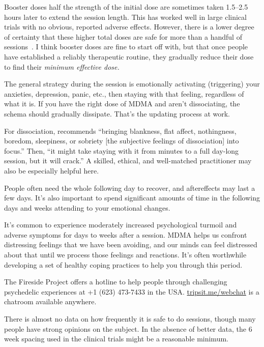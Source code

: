 \documentclass[11pt,oneside]{book}
\newcommand{\mdcite}[1]{}
\begin{document}
Booster doses half the strength of the initial dose are sometimes taken 1.5--2.5\,hours later to extend the session length. This has worked well in large clinical trials with no obvious, reported adverse effects. However, there is a lower degree of certainty that these higher total doses are safe for more than a handful of sessions~\mdcite{baggottSupplements}. I think booster doses are fine to start off with, but that once people have established a reliably therapeutic routine, they gradually reduce their dose to find their \textit{minimum effective dose.}

The general strategy during the session is emotionally activating (triggering) your anxieties, depression, panic, etc., then staying with that feeling, regardless of what it is. If you have the right dose of MDMA and aren't dissociating, the schema should gradually dissipate. That's the updating process at work.

For dissociation, \textcite[p. 14]{razviPSIP} recommends \enquote{bringing blankness, flat affect, nothingness, boredom, sleepiness, or sobriety [the subjective feelings of dissociation] into focus.} Then, \enquote{it might take staying with it from minutes to a full day-long session, but it will crack.} A skilled, ethical, and well-matched practitioner may also be especially helpful here.

People often need the whole following day to recover, and aftereffects may last a few days. It's also important to spend significant amounts of time in the following days and weeks attending to your emotional changes.

It's common to experience moderately increased psychological turmoil and adverse symptoms for days to weeks after a session. MDMA helps us confront distressing feelings that we have been avoiding, and our minds can feel distressed about that until we process those feelings and reactions. It's often worthwhile developing a set of healthy coping practices to help you through this period.

The Fireside Project offers a hotline to help people through challenging psychedelic experiences at +1 (623) 473-7433 in the USA. \href{https://tripsit.me/webchat}{tripsit.me/webchat} is a chatroom available anywhere.

There is almost no data on how frequently it is safe to do sessions, though many people have strong opinions on the subject. In the absence of better data, the 6\,week spacing used in the clinical trials might be a reasonable minimum.
\end{document}
